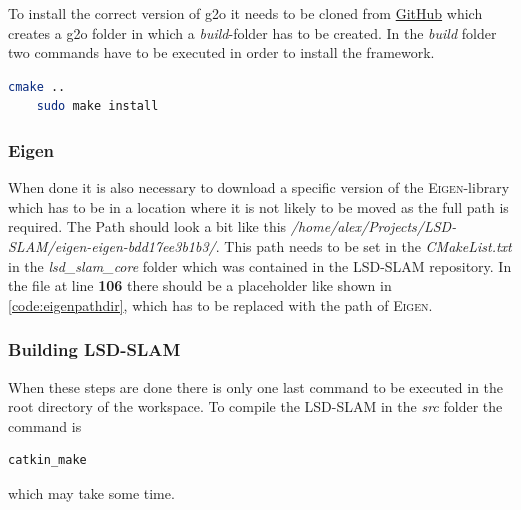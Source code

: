 To install the correct version of \gls{g2o} it needs to be cloned from \href{https://github.com/felixendres/g2o.git}{GitHub} \cite{g2ofelixendres} which creates a g2o folder in which a \textit{build}-folder has to be created. In the \textit{build} folder two commands have to be executed in order to install the framework.\newline
\begin{lstlisting}[language=bash]
    cmake ..
    sudo make install
\end{lstlisting}

\subsubsection{Eigen}\label{ref:eigen}
When done it is also necessary to download a specific version of the \textsc{Eigen}-library which has to be in a location where it is not likely to be moved as the full path is required. The Path should look a bit like this \textit{/home/alex/Projects/LSD-SLAM/eigen-eigen-bdd17ee3b1b3/}. This path needs to be set in the \textit{CMakeList.txt} in the \textit{lsd\_slam\_core} folder which was contained in the LSD-SLAM repository. In the file at line \textbf{106} there should be a placeholder like shown in \ref{code:eigenpathdir}, which has to be replaced with the path of \textsc{Eigen}.\newline


\subsubsection{Building LSD-SLAM}\label{ref:buildinglsdslam}
When these steps are done there is only one last command to be executed in the root directory of the workspace. To compile the LSD-SLAM in the \textit{src} folder the command is \newline
\begin{lstlisting}[language=bash]
    catkin_make
\end{lstlisting}
which may take some time. 


